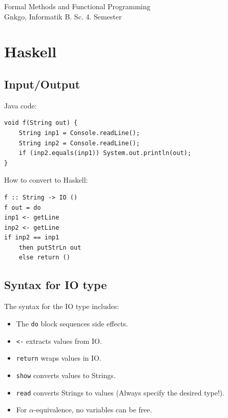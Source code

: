 \documentclass{article}
\begin{document}
\pagestyle{fancy}
\rfoot{\thepage}
\cfoot{}
\renewcommand{\footrulewidth}{1pt}


\begin{titlepage}
    \thispagestyle{fancy}
    \renewcommand{\headrulewidth}{1pt}

    \center
    \vspace*{1.0cm}
    \Large Formal Methods and Functional Programming \\[.5 cm]
    \large
    \normalsize
    Gnkgo, Informatik B. Sc. 4. Semester \\
    \vfill
\end{titlepage}

\tableofcontents
\newpage %
\tableofcontents 


\section{Haskell}

\subsection{Input/Output}

Java code:

\begin{lstlisting}[style=javastyle, caption=Java Code, label=code:java]
void f(String out) {
    String inp1 = Console.readLine();
    String inp2 = Console.readLine();
    if (inp2.equals(inp1)) System.out.println(out);
}
\end{lstlisting}
How to convert to Haskell:
\begin{lstlisting}[style=haskellstyle, caption=Haskell Code, label=code:haskell]
f :: String -> IO ()
f out = do
inp1 <- getLine
inp2 <- getLine
if inp2 == inp1
    then putStrLn out
    else return ()
\end{lstlisting}

\subsection{Syntax for IO type}

The syntax for the IO type includes:
\begin{itemize}
    \item The \texttt{do} block sequences side effects.
    \item \texttt{<-} extracts values from IO.
    \item \texttt{return} wraps values in IO.
    \item \texttt{show} converts values to Strings.
    \item \texttt{read} converts Strings to values (Always specify the desired type!).
    \item For $\alpha$-equivalence, no variables can be free.
\end{itemize}
\end{document}
